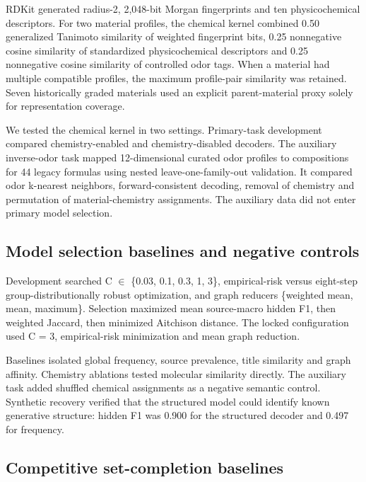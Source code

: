 \documentclass[12pt]{article}
\begin{document}
RDKit generated radius-2, 2,048-bit Morgan fingerprints \cite{ref20} and ten physicochemical descriptors. For two material profiles, the chemical kernel combined 0.50 generalized Tanimoto similarity of weighted fingerprint bits, 0.25 nonnegative cosine similarity of standardized physicochemical descriptors and 0.25 nonnegative cosine similarity of controlled odor tags. When a material had multiple compatible profiles, the maximum profile-pair similarity was retained. Seven historically graded materials used an explicit parent-material proxy solely for representation coverage.

We tested the chemical kernel in two settings. Primary-task development compared chemistry-enabled and chemistry-disabled decoders. The auxiliary inverse-odor task mapped 12-dimensional curated odor profiles to compositions for 44 legacy formulas using nested leave-one-family-out validation. It compared odor k-nearest neighbors, forward-consistent decoding, removal of chemistry and permutation of material-chemistry assignments. The auxiliary data did not enter primary model selection.

\subsection*{Model selection baselines and negative controls}

Development searched C \ensuremath{\in} \{0.03, 0.1, 0.3, 1, 3\}, empirical-risk versus eight-step group-distributionally robust optimization, and graph reducers \{weighted mean, mean, maximum\}. Selection maximized mean source-macro hidden F1, then weighted Jaccard, then minimized Aitchison distance. The locked configuration used C = 3, empirical-risk minimization and mean graph reduction.

Baselines isolated global frequency, source prevalence, title similarity and graph affinity. Chemistry ablations tested molecular similarity directly. The auxiliary task added shuffled chemical assignments as a negative semantic control. Synthetic recovery verified that the structured model could identify known generative structure: hidden F1 was 0.900 for the structured decoder and 0.497 for frequency.

\subsection*{Competitive set-completion baselines}
\end{document}
